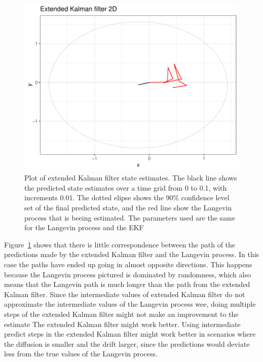 \begin{figure}[H]
    \centering
    \includegraphics[width=\linewidth]{Images/discussion/EKF high diffusion path.pdf}
    \caption[Extended Kalman filter]{Plot of extended Kalman filter state estimates. The black line shows the predicted state estimates over a time grid from 0 to 0.1, with increments 0.01. The dotted elipse shows the 90\% confidence level set of the final predicted state, and the red line show the Langevin process that is beeing estimated. The parameters used are the same for the Langevin process and the EKF}
    \label{fig:EKF high diffusion}
\end{figure}

Figure~\ref{fig:EKF high diffusion} shows that there is little correspondence between the path of the predictions made by the extended Kalman filter and the Langevin process. In this case the paths have ended up going in almost opposite directions. This happens because the Langevin process pictured is dominated by randomness, which also means that the Langevin path is much longer than the path from the extended Kalman filter. Since the intermediate values of extended Kalman filter do not approximate the intermediate values of the Langevin process wee, doing multiple steps of the extended Kalman filter might not make an improvement to the estimate
The extended Kalman filter might work better. Using intermediate predict steps in the extended Kalman filter might work better in scenarios where the diffusion is smaller and the drift larger, since the predictions would deviate less from the true values of the Langevin process.

